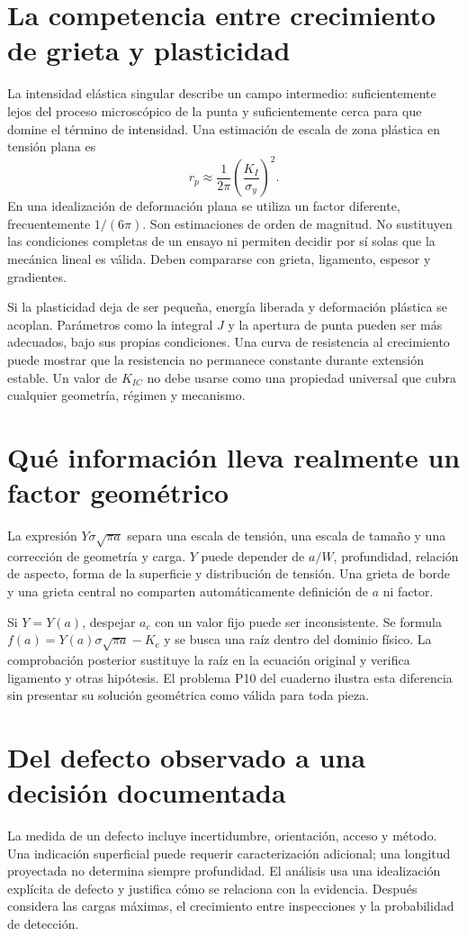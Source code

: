 
\section{La competencia entre crecimiento de grieta y plasticidad}
La intensidad elástica singular describe un campo intermedio: suficientemente lejos del proceso microscópico de la punta y suficientemente cerca para que domine el término de intensidad. Una estimación de escala de zona plástica en tensión plana es
\begin{equation}r_p\approx\frac{1}{2\pi}\left(\frac{K_I}{\sigma_y}\right)^2.\end{equation}
En una idealización de deformación plana se utiliza un factor diferente, frecuentemente $1/(6\pi)$. Son estimaciones de orden de magnitud. No sustituyen las condiciones completas de un ensayo ni permiten decidir por sí solas que la mecánica lineal es válida. Deben compararse con grieta, ligamento, espesor y gradientes.

Si la plasticidad deja de ser pequeña, energía liberada y deformación plástica se acoplan. Parámetros como la integral $J$ y la apertura de punta pueden ser más adecuados, bajo sus propias condiciones. Una curva de resistencia al crecimiento puede mostrar que la resistencia no permanece constante durante extensión estable. Un valor de $K_{IC}$ no debe usarse como una propiedad universal que cubra cualquier geometría, régimen y mecanismo.
\section{Qué información lleva realmente un factor geométrico}
La expresión $Y\sigma\sqrt{\pi a}$ separa una escala de tensión, una escala de tamaño y una corrección de geometría y carga. $Y$ puede depender de $a/W$, profundidad, relación de aspecto, forma de la superficie y distribución de tensión. Una grieta de borde y una grieta central no comparten automáticamente definición de $a$ ni factor.

Si $Y=Y(a)$, despejar $a_c$ con un valor fijo puede ser inconsistente. Se formula $f(a)=Y(a)\sigma\sqrt{\pi a}-K_c$ y se busca una raíz dentro del dominio físico. La comprobación posterior sustituye la raíz en la ecuación original y verifica ligamento y otras hipótesis. El problema P10 del cuaderno ilustra esta diferencia sin presentar su solución geométrica como válida para toda pieza.
\section{Del defecto observado a una decisión documentada}
La medida de un defecto incluye incertidumbre, orientación, acceso y método. Una indicación superficial puede requerir caracterización adicional; una longitud proyectada no determina siempre profundidad. El análisis usa una idealización explícita de defecto y justifica cómo se relaciona con la evidencia. Después considera las cargas máximas, el crecimiento entre inspecciones y la probabilidad de detección.

